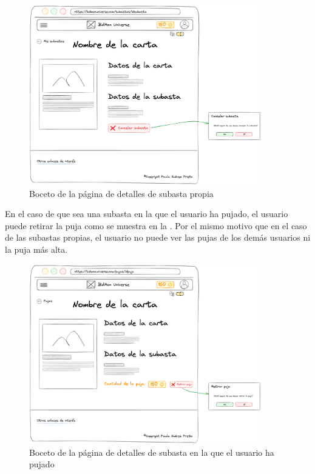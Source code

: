 \begin{figure}[H]
    \centering
    \includegraphics[width=0.9\textwidth]{figures/6-Analisis/6-Interfaz/prototipos/detalle-subasta-propia.png}
    \caption{Boceto de la página de detalles de subasta propia}
    \label{fig:p_auction_details_own}
    \hypertarget{fig:p_auction_details_own}{}
\end{figure}

En el caso de que sea una subasta en la que el usuario ha pujado, el usuario puede retirar la puja como se muestra en la .
Por el mismo motivo que en el caso de las subastas propias, el usuario no puede ver las pujas de los demás usuarios ni la puja más alta.

\begin{figure}[H]
    \centering
    \includegraphics[width=0.9\textwidth]{figures/6-Analisis/6-Interfaz/prototipos/detalle-puja.png}
    \caption{Boceto de la página de detalles de subasta en la que el usuario ha pujado}
    \label{fig:p_auction_details_bid}
    \hypertarget{fig:p_auction_details_bid}{}
\end{figure}


